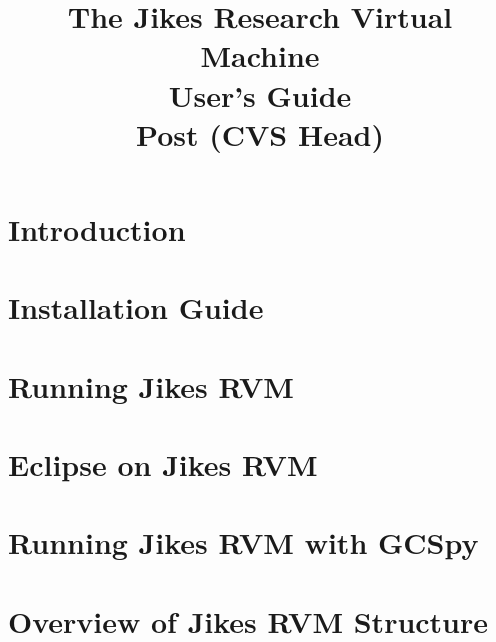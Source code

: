 \documentclass{article}
\title{\texonly{\vfill} {\huge The Jikes\TMboth{} 
Research Virtual Machine \\
User's Guide} \\ {\huge Post \version{} (CVS Head)}\\ { } \texonly{\vfill} }
\newcommand{\jrvm}{Jikes RVM}
\begin{document}
\maketitle
\date{}

\T \newpage
   \T 
   \T \cleardoublepage

\label{hlxtoc}
\T \tableofcontents
\T \listoffigures
\T \listoftables
\W {}

\T \newpage
\section{Introduction}


\T \newpage
{}
\section{Installation Guide} \label{section:installation}


\T \newpage
\section{Running \jrvm} \label{section:running}


\T \newpage
\section{Eclipse on Jikes RVM} \label{section:eclipse}


\T \newpage
\section{Running Jikes RVM with GCSpy} \label{section:gcspy}


\T \newpage
{}
\section{Overview of \jrvm{} Structure}

\end{document}
